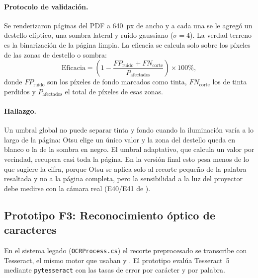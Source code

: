 \paragraph{Protocolo de validación.} Se renderizaron \FDosPaginas{} páginas del PDF a 640~px de ancho y a cada una se le agregó un destello elíptico, una sombra lateral y ruido gaussiano ($\sigma=4$). La verdad terreno es la binarización de la página limpia. La eficacia se calcula solo sobre los píxeles de las zonas de destello o sombra:
\begin{equation}
\mathrm{Eficacia}=\left(1-\frac{FP_{\text{ruido}}+FN_{\text{corte}}}{P_{\text{afectados}}}\right)\times100\%,
\end{equation}
donde $FP_{\text{ruido}}$ son los píxeles de fondo marcados como tinta, $FN_{\text{corte}}$ los de tinta perdidos y $P_{\text{afectados}}$ el total de píxeles de esas zonas.

\paragraph{Hallazgo.} Un umbral global no puede separar tinta y fondo cuando la iluminación varía a lo largo de la página: Otsu elige un único valor y la zona del destello queda en blanco o la de la sombra en negro. El umbral adaptativo, que calcula un valor por vecindad, recupera casi toda la página. En la versión final esto pesa menos de lo que sugiere la cifra, porque Otsu se aplica solo al recorte pequeño de la palabra resaltada y no a la página completa, pero la sensibilidad a la luz del proyector debe medirse con la cámara real (E40/E41 de \citealp{ibaceta2023}).

\subsection{Prototipo F3: Reconocimiento óptico de caracteres}

En el sistema legado (\texttt{OCRProcess.cs}) el recorte preprocesado se transcribe con Tesseract, el mismo motor que usaban \citet{carrasco2017} y \citet{contreras2019}. El prototipo evalúa Tesseract~5 mediante \texttt{pytesseract} con las tasas de error por carácter y por palabra.

